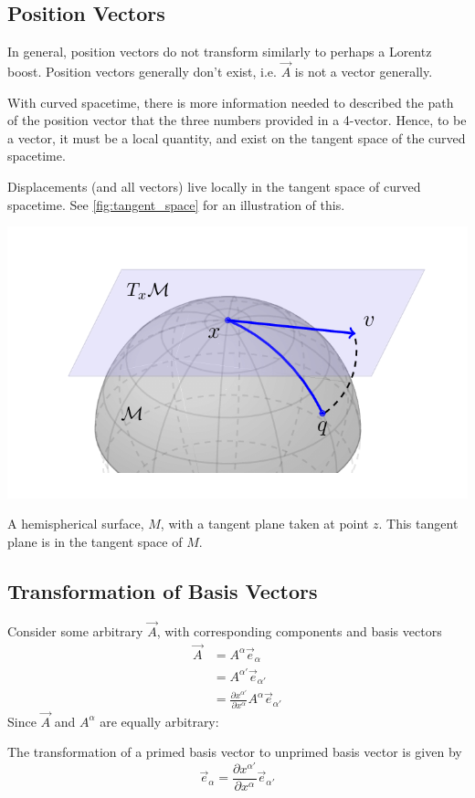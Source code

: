 \subsection{Position Vectors}
In general, position vectors do not transform similarly to perhaps a Lorentz boost. Position vectors generally don't exist, i.e. $\vec{A}$ is not a vector generally. \par With curved spacetime, there is more information needed to described the path of the position vector that the three numbers provided in a 4-vector. Hence, to be a vector, it must be a local quantity, and exist on the tangent space of the curved spacetime. \par Displacements (and all vectors) live locally in the tangent space of curved spacetime. See \vref{fig:tangent_space} for an illustration of this.
\begin{marginfigure}[-5cm]
    \centering
    \includegraphics[width=\linewidth]{images/Figure-S3-Geometric-illustration-of-tangent-vector-tangent-space-curve-and.png}
    \caption{A hemispherical surface, $M$, with a tangent plane taken at point $z$. This tangent plane is in the tangent space of $M$.}
    \label{fig:tangent_space}
\end{marginfigure}

\subsection{Transformation of Basis Vectors}
Consider some arbitrary $\vec{A}$, with corresponding components and basis vectors
\begin{align*}
    \vec{A} & = A^\alpha \vec{e}_\alpha \\ & = A^{\alpha'} \vec{e}_{\alpha '} \\ & = \frac{\partial x^{\alpha'}}{\partial x^\alpha} A^\alpha \vec{e}_{\alpha'}
\end{align*}
Since $\vec{A}$ and $A^\alpha$ are equally arbitrary:
\begin{definition}
    The transformation of a primed basis vector to unprimed basis vector is given by
    $$ \vec{e}_\alpha = \frac{\partial x^{\alpha'}}{\partial x^\alpha} \vec{e}_{\alpha'} $$
\end{definition}

